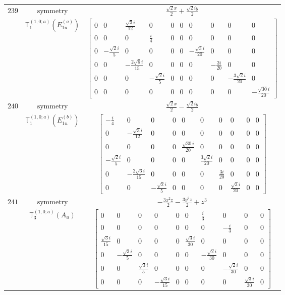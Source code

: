 \documentclass[fleqn,8pt,landscape]{jsarticle}
\begin{document}
\begin{longtable}{ccc}
$ 239 $ & $ \text{symmetry} $ & $ \frac{\sqrt{2} x}{2} + \frac{\sqrt{2} i y}{2} $ \\
$  $ & $ \mathbb{T}_{1}^{(1,0;a)}(E_{1u}^{(a)}) $ & $ \begin{bmatrix} 0 & 0 & \frac{\sqrt{3} i}{12} & 0 & 0 & 0 & 0 & 0 & 0 & 0 \\ 0 & 0 & 0 & \frac{i}{4} & 0 & 0 & 0 & 0 & 0 & 0 \\ 0 & - \frac{\sqrt{2} i}{5} & 0 & 0 & 0 & 0 & - \frac{\sqrt{3} i}{20} & 0 & 0 & 0 \\ 0 & 0 & - \frac{2 \sqrt{6} i}{15} & 0 & 0 & 0 & 0 & - \frac{3 i}{20} & 0 & 0 \\ 0 & 0 & 0 & - \frac{\sqrt{2} i}{5} & 0 & 0 & 0 & 0 & - \frac{3 \sqrt{2} i}{20} & 0 \\ 0 & 0 & 0 & 0 & 0 & 0 & 0 & 0 & 0 & - \frac{\sqrt{30} i}{20} \end{bmatrix} $ \\ \hline
$ 240 $ & $ \text{symmetry} $ & $ \frac{\sqrt{2} x}{2} - \frac{\sqrt{2} i y}{2} $ \\
$  $ & $ \mathbb{T}_{1}^{(1,0;a)}(E_{1u}^{(b)}) $ & $ \begin{bmatrix} - \frac{i}{4} & 0 & 0 & 0 & 0 & 0 & 0 & 0 & 0 & 0 \\ 0 & - \frac{\sqrt{3} i}{12} & 0 & 0 & 0 & 0 & 0 & 0 & 0 & 0 \\ 0 & 0 & 0 & 0 & \frac{\sqrt{30} i}{20} & 0 & 0 & 0 & 0 & 0 \\ - \frac{\sqrt{2} i}{5} & 0 & 0 & 0 & 0 & \frac{3 \sqrt{2} i}{20} & 0 & 0 & 0 & 0 \\ 0 & - \frac{2 \sqrt{6} i}{15} & 0 & 0 & 0 & 0 & \frac{3 i}{20} & 0 & 0 & 0 \\ 0 & 0 & - \frac{\sqrt{2} i}{5} & 0 & 0 & 0 & 0 & \frac{\sqrt{3} i}{20} & 0 & 0 \end{bmatrix} $ \\ \hline
$ 241 $ & $ \text{symmetry} $ & $ - \frac{3 x^{2} z}{2} - \frac{3 y^{2} z}{2} + z^{3} $ \\
$  $ & $ \mathbb{T}_{3}^{(1,0;a)}(A_{u}) $ & $ \begin{bmatrix} 0 & 0 & 0 & 0 & 0 & 0 & \frac{i}{3} & 0 & 0 & 0 \\ 0 & 0 & 0 & 0 & 0 & 0 & 0 & - \frac{i}{3} & 0 & 0 \\ \frac{\sqrt{3} i}{15} & 0 & 0 & 0 & 0 & \frac{\sqrt{3} i}{30} & 0 & 0 & 0 & 0 \\ 0 & - \frac{\sqrt{3} i}{5} & 0 & 0 & 0 & 0 & - \frac{\sqrt{2} i}{30} & 0 & 0 & 0 \\ 0 & 0 & \frac{\sqrt{3} i}{5} & 0 & 0 & 0 & 0 & - \frac{\sqrt{2} i}{30} & 0 & 0 \\ 0 & 0 & 0 & - \frac{\sqrt{3} i}{15} & 0 & 0 & 0 & 0 & \frac{\sqrt{3} i}{30} & 0 \end{bmatrix} $ \\ \hline

\end{longtable}
\end{document}
